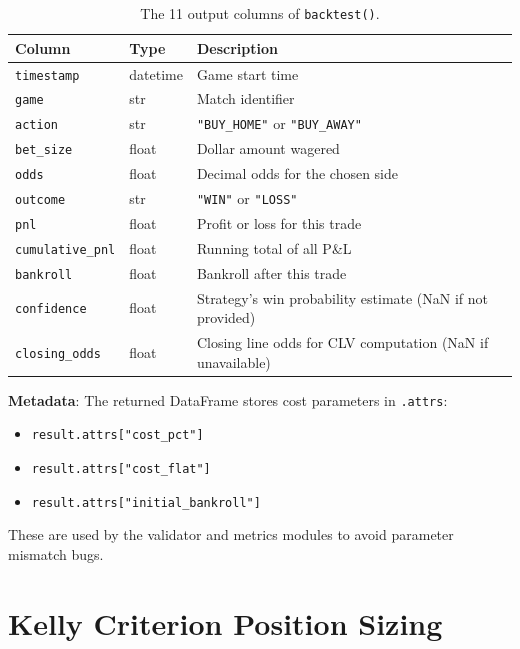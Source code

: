 \documentclass[12pt,a4paper]{report}
\theoremstyle{definition}
\newcommand{\code}[1]{\texttt{#1}}
\newcommand{\func}[1]{\texttt{#1()}}
\begin{document}
\begin{table}[H]
\centering
\caption{The 11 output columns of \func{backtest}.}
\label{tab:output-columns}
\begin{tabularx}{\textwidth}{llX}
\toprule
\textbf{Column} & \textbf{Type} & \textbf{Description} \\
\midrule
\code{timestamp}       & datetime & Game start time \\
\code{game}            & str      & Match identifier \\
\code{action}          & str      & \code{"BUY\_HOME"} or \code{"BUY\_AWAY"} \\
\code{bet\_size}       & float    & Dollar amount wagered \\
\code{odds}            & float    & Decimal odds for the chosen side \\
\code{outcome}         & str      & \code{"WIN"} or \code{"LOSS"} \\
\code{pnl}             & float    & Profit or loss for this trade \\
\code{cumulative\_pnl} & float    & Running total of all P\&L \\
\code{bankroll}        & float    & Bankroll after this trade \\
\code{confidence}      & float    & Strategy's win probability estimate (NaN if not provided) \\
\code{closing\_odds}   & float    & Closing line odds for CLV computation (NaN if unavailable) \\
\bottomrule
\end{tabularx}
\end{table}

\textbf{Metadata}: The returned DataFrame stores cost parameters in \code{.attrs}:
\begin{itemize}
    \item \code{result.attrs["cost\_pct"]}
    \item \code{result.attrs["cost\_flat"]}
    \item \code{result.attrs["initial\_bankroll"]}
\end{itemize}
These are used by the validator and metrics modules to avoid parameter mismatch bugs.


\chapter{Kelly Criterion Position Sizing}
\label{ch:kelly}
\end{document}
